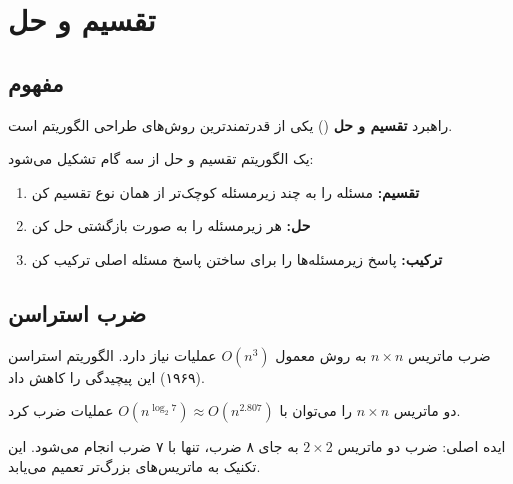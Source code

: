 \documentclass{matinbook}
\begin{document}
    \section{تقسیم و حل}
    
    \subsection{مفهوم}
    
    راهبرد \textbf{تقسیم و حل}
    () یکی از قدرتمندترین
    روش‌های طراحی الگوریتم است.
    
    \begin{definition}[تقسیم و حل]
        یک الگوریتم تقسیم و حل از سه گام تشکیل می‌شود:
        \begin{enumerate}
            \item \textbf{تقسیم:} مسئله را به چند زیرمسئله
            کوچک‌تر از همان نوع تقسیم کن
            \item \textbf{حل:} هر زیرمسئله را به صورت
            بازگشتی حل کن
            \item \textbf{ترکیب:} پاسخ زیرمسئله‌ها را
            برای ساختن پاسخ مسئله اصلی ترکیب کن
        \end{enumerate}
        \label{def:divide-conquer}
    \end{definition}
    
    \subsection{ضرب استراسن}
    
    ضرب ماتریس $n \times n$ به روش معمول
    $O(n^{3})$ عملیات نیاز دارد.
    الگوریتم استراسن (۱۹۶۹)
    این پیچیدگی را کاهش داد.
    
    \begin{theorem}
        دو ماتریس $n \times n$ را می‌توان با
        $O(n^{\log_{2} 7}) \approx O(n^{2.807})$
        عملیات ضرب کرد.
        \label{thm:strassen}
    \end{theorem}
    
    ایده اصلی: ضرب دو ماتریس $2 \times 2$ به جای
    ۸ ضرب، تنها با ۷ ضرب انجام می‌شود.
    این تکنیک به ماتریس‌های بزرگ‌تر تعمیم می‌یابد.
    
\end{document}
